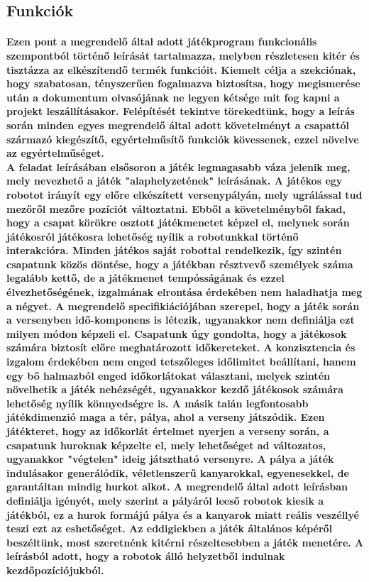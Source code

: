 \newpage
\subsection{Funkciók}
\paragraph{
Ezen pont a megrendelő által adott játékprogram funkcionális szempontból történő leírását tartalmazza, melyben részletesen kitér és tisztázza az elkészítendő termék funkcióit. Kiemelt célja a szekciónak, hogy szabatosan, tényszerűen fogalmazva biztosítsa, hogy megismerése után a dokumentum olvasójának ne legyen kétsége mit fog kapni a projekt leszállításakor. Felépítését tekintve törekedtünk, hogy a leírás során minden egyes megrendelő által adott követelményt a csapattól származó kiegészítő, egyértelműsítő funkciók kövessenek, ezzel növelve az egyértelműséget.
\\
A feladat leírásában elsősoron a játék legmagasabb váza jelenik meg, mely nevezhető a játék "alaphelyzetének" leírásának. A játékos egy robotot irányít egy előre elkészített versenypályán, mely ugrálással tud mezőről mezőre pozíciót változtatni. Ebből a követelményből fakad, hogy a csapat körökre osztott játékmenetet képzel el, melynek során játékosról játékosra lehetőség nyílik a robotunkkal történő interakcióra. Minden játékos saját robottal rendelkezik, így szintén csapatunk közös döntése, hogy a játékban résztvevő személyek száma legalább kettő, de a játékmenet tempósságának és ezzel élvezhetőségének, izgalmának elrontása érdekében nem haladhatja meg a négyet. A megrendelő specifikiációjában szerepel, hogy a játék során a versenyben idő-komponens is létezik, ugyanakkor nem definiálja ezt milyen módon képzeli el. Csapatunk úgy gondolta, hogy a játékosok számára biztosít előre meghatározott időkereteket. A konzisztencia és izgalom érdekében nem enged tetszőleges időlimitet beállítani, hanem egy bő halmazból enged időkorlátokat választani, melyek szintén növelhetik a játék nehézségét, ugyanakkor kezdő játékosok számára lehetőség nyílik könnyedségre is. A másik talán legfontosabb játékdimenzió maga a tér, pálya, ahol a verseny játszódik. Ezen játékteret, hogy az időkorlát értelmet nyerjen a verseny során, a csapatunk huroknak képzelte el, mely lehetőséget ad változatos, ugyanakkor "végtelen" ideig játsztható versenyre. A pálya a játék indulásakor generálódik, véletlenszerű kanyarokkal, egyenesekkel, de garantáltan mindig hurkot alkot. A megrendelő által adott leírásban definiálja igényét, mely szerint a pályáról leeső robotok kiesik a játékból, ez a hurok formájú pálya és a kanyarok miatt reális veszéllyé teszi ezt az eshetőséget. Az eddigiekben a játék általános képéről beszéltünk, most szeretnénk kitérni részeltesebben a játék menetére. A leírásból adott, hogy a robotok álló helyzetből indulnak kezdőpozíciójukból.
}
